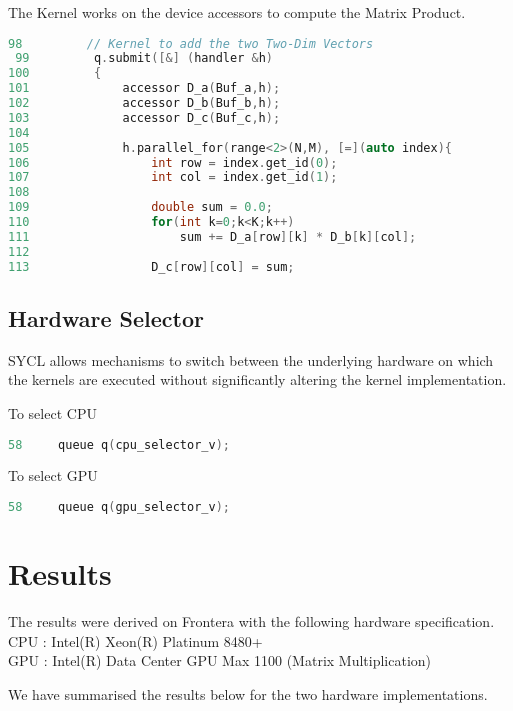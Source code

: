 \documentclass[14pt,fleqn]{article}
\begin{document}
The Kernel works on the device accessors to compute the Matrix Product.
\begin{lstlisting}[language=C++]
 98         // Kernel to add the two Two-Dim Vectors
 99         q.submit([&] (handler &h)
100         {
101             accessor D_a(Buf_a,h);
102             accessor D_b(Buf_b,h);
103             accessor D_c(Buf_c,h);
104
105             h.parallel_for(range<2>(N,M), [=](auto index){
106                 int row = index.get_id(0);
107                 int col = index.get_id(1);
108
109                 double sum = 0.0;
110                 for(int k=0;k<K;k++)
111                     sum += D_a[row][k] * D_b[k][col];
112
113                 D_c[row][col] = sum;
\end{lstlisting}

\subsection{Hardware Selector}
SYCL allows mechanisms to switch between the underlying hardware on which the kernels are executed without significantly altering the kernel implementation.

To select CPU
\begin{lstlisting}[language=C++]
 58     queue q(cpu_selector_v);
\end{lstlisting}

To select GPU
\begin{lstlisting}[language=C++]
 58     queue q(gpu_selector_v);
\end{lstlisting}

\vspace{10pt}

\section{Results}
The results were derived on Frontera with the following hardware specification.\\
CPU : Intel(R) Xeon(R) Platinum 8480+ \\
GPU : Intel(R) Data Center GPU Max 1100 (Matrix Multiplication)

We have summarised the results below for the two hardware implementations.


\end{document}

